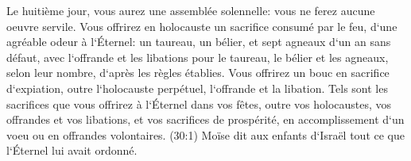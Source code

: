 \verse Le huitième jour, vous aurez une assemblée solennelle: vous ne ferez aucune oeuvre servile. 
\verse Vous offrirez en holocauste un sacrifice consumé par le feu, d`une agréable odeur à l`Éternel: un taureau, un bélier, et sept agneaux d`un an sans défaut, 
\verse avec l`offrande et les libations pour le taureau, le bélier et les agneaux, selon leur nombre, d`après les règles établies. 
\verse Vous offrirez un bouc en sacrifice d`expiation, outre l`holocauste perpétuel, l`offrande et la libation. 
\verse Tels sont les sacrifices que vous offrirez à l`Éternel dans vos fêtes, outre vos holocaustes, vos offrandes et vos libations, et vos sacrifices de prospérité, en accomplissement d`un voeu ou en offrandes volontaires. 
\verse (30:1) Moïse dit aux enfants d`Israël tout ce que l`Éternel lui avait ordonné. 

